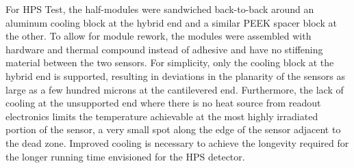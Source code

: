 For HPS Test, the half-modules were sandwiched back-to-back around an aluminum cooling block at the hybrid end and a similar PEEK spacer block at the other.  To allow for module rework, the modules were assembled with hardware and thermal compound instead of adhesive and have no stiffening material between the two sensors. For simplicity, only the cooling block at the hybrid end is supported, resulting in deviations in the planarity of the sensors as large as a few hundred microns at the cantilevered end. Furthermore, the lack of cooling at the unsupported end where there is no heat source from readout electronics limits the temperature achievable at the most highly irradiated portion of the sensor, a very small spot along the edge of the sensor adjacent to the dead zone.  Improved cooling is necessary to achieve the longevity required for the longer running time envisioned for the HPS detector.

